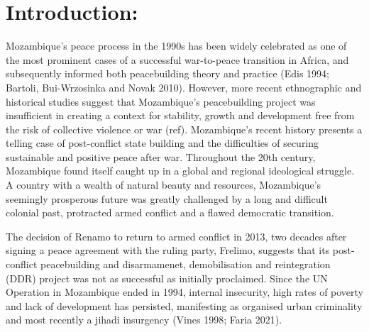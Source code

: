 \chapter{Introduction: }
\label{chp:DEM}


Mozambique’s peace process in the 1990s has been widely celebrated as one of the most prominent cases of a successful war-to-peace transition in Africa, and subsequently informed both peacebuilding theory and practice (Edis 1994; Bartoli, Bui-Wrzosinka and Novak 2010). However, more recent ethnographic and historical studies suggest that Mozambique’s peacebuilding project was insufficient in creating a context for stability, growth and development free from the risk of collective violence or war (ref). Mozambique’s recent history presents a telling case of post-conflict state building and the difficulties of securing sustainable and positive peace after war. Throughout the 20th century, Mozambique found itself caught up in a global and regional ideological struggle. A country with a wealth of natural beauty and resources, Mozambique's seemingly prosperous future was greatly challenged by a long and difficult colonial past, protracted armed conflict and a flawed democratic transition. 

The decision of Renamo to return to armed conflict in 2013, two decades after signing a peace agreement with the ruling party, Frelimo, suggests that its post-conflict peacebuilding and disarmamenet, demobilisation and reintegration (DDR) project was not as successful as initially proclaimed. Since the UN Operation in Mozambique ended in 1994, internal insecurity, high rates of poverty and lack of development has persisted, manifesting as organised urban criminality and most recently a jihadi insurgency (Vines 1998; Faria 2021). 


